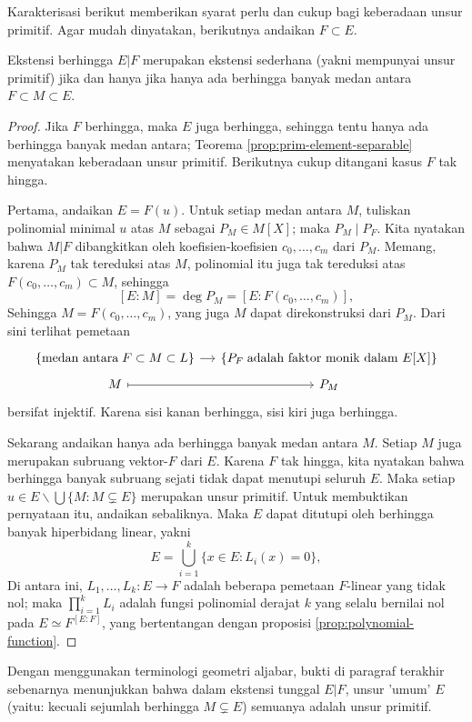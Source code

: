 Karakterisasi berikut memberikan syarat perlu dan cukup bagi keberadaan unsur primitif. Agar mudah dinyatakan, berikutnya andaikan $F \subset E$.
\begin{theorem}[E.\ Steinitz]\label{prop:prim-element}
	Ekstensi berhingga $E|F$ merupakan ekstensi sederhana (yakni mempunyai unsur primitif) jika dan hanya jika hanya ada berhingga banyak medan antara $F \subset M \subset E$.
\end{theorem}
\begin{proof}
	Jika $F$ berhingga, maka $E$ juga berhingga, sehingga tentu hanya ada berhingga banyak medan antara; Teorema \ref{prop:prim-element-separable} menyatakan keberadaan unsur primitif. Berikutnya cukup ditangani kasus $F$ tak hingga.
	
	Pertama, andaikan $E = F(u)$. Untuk setiap medan antara $M$, tuliskan polinomial minimal $u$ atas $M$ sebagai $P_M \in M[X]$; maka $P_M \mid P_F$. Kita nyatakan bahwa $M|F$ dibangkitkan oleh koefisien-koefisien $c_0, \ldots, c_m$ dari $P_M$. Memang, karena $P_M$ tak tereduksi atas $M$, polinomial itu juga tak tereduksi atas $F(c_0, \ldots, c_m) \subset M$, sehingga
	\[ [E:M] = \deg P_M = [E:F(c_0, \ldots, c_m)], \]
	Sehingga $M=F(c_0, \ldots, c_m)$, yang juga $M$ dapat direkonstruksi dari $P_M$. Dari sini terlihat pemetaan
	\[\begin{tikzcd}[row sep=tiny, column sep=small]
		\{ \text{medan antara}\; F \subset M \subset L \} \arrow[r] & \{ P_F \;\text{adalah faktor monik dalam $E[X]$} \} \\
		M \arrow[mapsto, r] & P_M
	\end{tikzcd}\]
	bersifat injektif. Karena sisi kanan berhingga, sisi kiri juga berhingga.
	
	Sekarang andaikan hanya ada berhingga banyak medan antara $M$. Setiap $M$ juga merupakan subruang vektor-$F$ dari $E$. Karena $F$ tak hingga, kita nyatakan bahwa berhingga banyak subruang sejati tidak dapat menutupi seluruh $E$. Maka setiap $u \in E \smallsetminus \bigcup\{M : M \subsetneq E \}$ merupakan unsur primitif. Untuk membuktikan pernyataan itu, andaikan sebaliknya. Maka $E$ dapat ditutupi oleh berhingga banyak hiperbidang linear, yakni
	\[ E = \bigcup_{i=1}^k \{x \in E : L_i(x) = 0\}, \]
	Di antara ini, $L_1, \ldots, L_k: E \to F$ adalah beberapa pemetaan $F$-linear yang tidak nol; maka $\prod_{i=1}^k L_i$ adalah fungsi polinomial derajat $k$ yang selalu bernilai nol pada $E \simeq F^{[E:F]}$, yang bertentangan dengan proposisi \ref{prop:polynomial-function}.
\end{proof}
Dengan menggunakan terminologi geometri aljabar, bukti di paragraf terakhir sebenarnya menunjukkan bahwa dalam ekstensi tunggal $E|F$, unsur 'umum' $E$ (yaitu: kecuali sejumlah berhingga $M \subsetneq E$) semuanya adalah unsur primitif.


